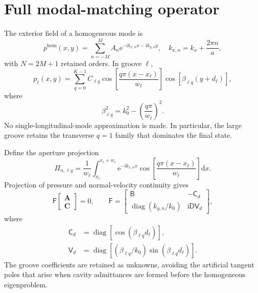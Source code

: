 \documentclass[aps,prl,reprint,superscriptaddress,nofootinbib,floatfix]{revtex4-2}
\newcommand{\ii}{\mathrm{i}}
\newcommand{\e}{\mathrm{e}}
\newcommand{\homg}{\mathrm{hom}}
\begin{document}
\section{Full modal-matching operator}

The exterior field of a homogeneous mode is
\begin{equation}
 p^{\homg}(x,y)=\sum_{n=-M}^{M}A_n
 \e^{-\ii k_{x,n}x-\ii k_{y,n}y},
 \quad k_{x,n}=k_x+\frac{2\pi n}{a},
 \label{eq:s-exterior}
\end{equation}
with $N=2M+1$ retained orders.  In groove $\ell$,
\begin{equation}
 p_\ell(x,y)=\sum_{q=0}^{K-1}C_{\ell q}
 \cos\!\left[\frac{q\pi(x-x_\ell)}{w_\ell}\right]
 \cos[\beta_{\ell q}(y+d_\ell)],
 \label{eq:s-groove}
\end{equation}
where
\begin{equation}
 \beta_{\ell q}^2=k_0^2-\left(\frac{q\pi}{w_\ell}\right)^2.
\end{equation}
No single-longitudinal-mode approximation is made.  In particular, the large
groove retains the transverse $q=1$ family that dominates the final state.

Define the aperture projection
\begin{equation}
 \Pi_{n,\ell q}=\frac{1}{w_\ell}
 \int_{x_\ell}^{x_\ell+w_\ell}
 \e^{-\ii k_{x,n}x}
 \cos\!\left[\frac{q\pi(x-x_\ell)}{w_\ell}\right]\mathrm{d}x.
 \label{eq:s-projection}
\end{equation}
Projection of pressure and normal-velocity continuity gives
\begin{equation}
 \mathsf F
 \begin{bmatrix}\bm A\\\bm C\end{bmatrix}=0,\qquad
 \mathsf F=
 \begin{bmatrix}
  \mathsf B&-\mathsf C_d\\
  \operatorname{diag}(k_{y,n}/k_0)&\ii\mathsf D\mathsf V_d
 \end{bmatrix},
 \label{eq:s-full}
\end{equation}
where
\begin{align}
 \mathsf C_d&=\operatorname{diag}[\cos(\beta_{\ell q}d_\ell)],\\
 \mathsf V_d&=\operatorname{diag}[(\beta_{\ell q}/k_0)
 \sin(\beta_{\ell q}d_\ell)].
\end{align}
The groove coefficients are retained as unknowns, avoiding the artificial
tangent poles that arise when cavity admittances are formed before the
homogeneous eigenproblem.
\end{document}

